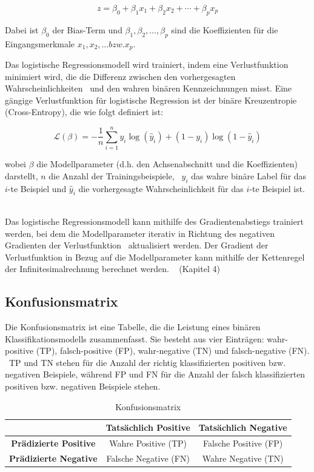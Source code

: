 $$ 
z = \beta_0 + \beta_1 x_1 + \beta_2 x_2 + \cdots + \beta_p x_p 
$$

Dabei ist $\beta_0$ der Bias-Term und $\beta_1, \beta_2, \ldots, \beta_p$ sind die Koeffizienten für die Eingangsmerkmale $x_1, x_2, \ldots bzw. x_p$.

Das logistische Regressionsmodell wird trainiert, indem eine Verlustfunktion minimiert wird, die die Differenz zwischen den vorhergesagten Wahrscheinlichkeiten \ 
und den wahren binären Kennzeichnungen misst. Eine gängige Verlustfunktion für logistische Regression ist der binäre Kreuzentropie (\glq Cross-Entropy\grqq{}), die wie folgt definiert ist: \

$$ 
\mathcal{L}(\beta) = -\frac{1}{n} \sum_{i=1}^n y_i \log(\hat{y}_i) + (1 - y_i) \log(1 - \hat{y}_i)
$$

wobei $\beta$ die Modellparameter (d.h. den Achsenabschnitt und die Koeffizienten) darstellt, $n$ die Anzahl der Trainingsbeispiele, \ 
$y_i$ das wahre binäre Label für das $i$-te Beispiel und $\hat{y}_i$ die vorhergesagte Wahrscheinlichkeit für das $i$-te Beispiel ist. \

Das logistische Regressionsmodell kann mithilfe des Gradientenabstiegs trainiert werden, bei dem die Modellparameter iterativ in Richtung des negativen Gradienten der Verlustfunktion \ 
aktualisiert werden. Der Gradient der Verlustfunktion in Bezug auf die Modellparameter kann mithilfe der Kettenregel der Infinitesimalrechnung berechnet werden. \
\cite{bishop2006pattern} (Kapitel 4) \cite{intoStatLearn}
\subsection{Konfusionsmatrix}\label{subsec:Konfusionsmatrix}
Die Konfusionsmatrix ist eine Tabelle, die die Leistung eines binären Klassifikationsmodells zusammenfasst. Sie besteht aus vier Einträgen: wahr-positive (TP), falsch-positive (FP), wahr-negative (TN) und falsch-negative (FN). \ 
TP und TN stehen für die Anzahl der richtig klassifizierten positiven bzw. negativen Beispiele, während FP und FN für die Anzahl der falsch klassifizierten positiven bzw. negativen Beispiele stehen.
\begin{table}[h]
  \centering
  \begin{tabular}{|c|c|c|}
  \hline
   & \textbf{Tatsächlich Positive} & \textbf{Tatsächlich Negative} \\
  \hline
  \textbf{Prädizierte Positive} & Wahre Positive (TP) & Falsche Positive (FP) \\
  \hline
  \textbf{Prädizierte Negative} & Falsche Negative (FN) & Wahre Negative (TN) \\
  \hline
  \end{tabular}
  \caption{Konfusionsmatrix}
  \label{tab:Konfusionsmatrix}
\end{table}

